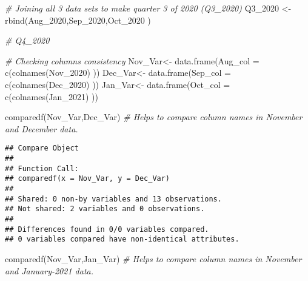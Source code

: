 \documentclass[
]{article}
\newenvironment{Shaded}{\begin{snugshade}}{\end{snugshade}}
\newcommand{\AttributeTok}[1]{\textcolor[rgb]{0.77,0.63,0.00}{#1}}
\newcommand{\CommentTok}[1]{\textcolor[rgb]{0.56,0.35,0.01}{\textit{#1}}}
\newcommand{\FunctionTok}[1]{\textcolor[rgb]{0.00,0.00,0.00}{#1}}
\newcommand{\NormalTok}[1]{#1}
\newcommand{\OtherTok}[1]{\textcolor[rgb]{0.56,0.35,0.01}{#1}}
\begin{document}
\begin{Shaded}
\begin{Highlighting}[]
\CommentTok{\# Joining all 3 data sets to make quarter 3 of 2020  (Q3\_2020)}
\NormalTok{  Q3\_2020 }\OtherTok{\textless{}{-}} \FunctionTok{rbind}\NormalTok{(Aug\_2020,Sep\_2020,Oct\_2020 )}
\end{Highlighting}
\end{Shaded}

\begin{Shaded}
\begin{Highlighting}[]
\CommentTok{\# Q4\_2020 }
\end{Highlighting}
\end{Shaded}

\begin{Shaded}
\begin{Highlighting}[]
\CommentTok{\# Checking columns consistency  }
\NormalTok{ Nov\_Var}\OtherTok{\textless{}{-}} \FunctionTok{data.frame}\NormalTok{(}\AttributeTok{Aug\_col =}  \FunctionTok{c}\NormalTok{(}\FunctionTok{colnames}\NormalTok{(Nov\_2020) ))}
\NormalTok{ Dec\_Var}\OtherTok{\textless{}{-}} \FunctionTok{data.frame}\NormalTok{(}\AttributeTok{Sep\_col =}  \FunctionTok{c}\NormalTok{(}\FunctionTok{colnames}\NormalTok{(Dec\_2020) ))}
\NormalTok{ Jan\_Var}\OtherTok{\textless{}{-}} \FunctionTok{data.frame}\NormalTok{(}\AttributeTok{Oct\_col =}  \FunctionTok{c}\NormalTok{(}\FunctionTok{colnames}\NormalTok{(Jan\_2021) ))}
 
 \FunctionTok{comparedf}\NormalTok{(Nov\_Var,Dec\_Var)  }\CommentTok{\# Helps to compare column names in November and December data.}
\end{Highlighting}
\end{Shaded}

\begin{verbatim}
## Compare Object
## 
## Function Call: 
## comparedf(x = Nov_Var, y = Dec_Var)
## 
## Shared: 0 non-by variables and 13 observations.
## Not shared: 2 variables and 0 observations.
## 
## Differences found in 0/0 variables compared.
## 0 variables compared have non-identical attributes.
\end{verbatim}

\begin{Shaded}
\begin{Highlighting}[]
 \FunctionTok{comparedf}\NormalTok{(Nov\_Var,Jan\_Var)  }\CommentTok{\# Helps to compare column names in November and January{-}2021 data.}
\end{Highlighting}
\end{Shaded}
\end{document}
